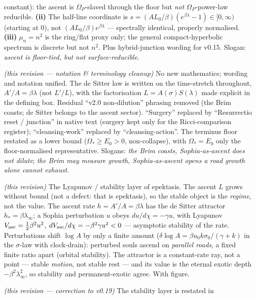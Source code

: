 \documentclass[11pt,a4paper]{article}
\theoremstyle{plain}
\theoremstyle{definition}
\theoremstyle{remark}
\begin{document}
\begin{description}[leftmargin=4.2em,style=nextline,itemsep=2pt]
constant): the ascent is $\Omega_P$-slaved through the floor but \emph{not} $\Omega_P$-power-law
reducible. \textbf{(ii)} The half-line coordinate is $s=(AL_0/\beta)(e^{\beta\lambda}-1)\in[0,\infty)$
(starting at $0$), not $(AL_0/\beta)e^{\beta\lambda}$ --- spectrally identical, properly normalised.
\textbf{(iii)} $\mu_n=n^2$ is the ring/flat proxy only; the general compact-hyperbolic spectrum is
discrete but not $n^2$. Plus hybrid-junction wording for v0.15. Slogan: \emph{ascent is floor-tied, but
not surface-reducible}.
\item[\textbf{v0.18}] \emph{(this revision --- notation \& terminology cleanup)} No new mathematics;
wording and notation unified. The de Sitter law is written on the time-stretch throughout,
$A'/A=\beta\lambda$ (not $L'/L$), with the factorisation $L=A(\sigma)S(\lambda)$ made explicit in the
defining box. Residual ``v2.0 non-dilution'' phrasing removed (the Brim coasts; de Sitter belongs to
the ascent sector). ``Surgery'' replaced by ``Resurrectio reset / junction'' in native text (surgery
kept only for the Ricci-comparison register); ``cleansing-work'' replaced by ``cleansing-action''. The
terminus floor restated as a lower bound ($\Omega_*\ge E_0>0$, non-collapse), with $\Omega_*=E_0$ only
the floor-normalised representative. Slogans: \emph{the Brim coasts, Sophia-as-ascent does not dilute};
\emph{the Brim may measure growth, Sophia-as-ascent opens a road growth alone cannot exhaust}.
\item[\textbf{v0.19}] \emph{(this revision)} The Lyapunov / stability layer of epektasis. The ascent
$L$ grows without bound (not a defect: that is epektasis), so the stable object is the \emph{regime},
not the value. The ascent rate $h=A'/A=\beta\lambda$ has the de Sitter attractor $h_*=\beta\lambda_\infty$;
a Sophia perturbation $u$ obeys $du/d\chi=-\gamma u$, with Lyapunov $V_{\rm asc}=\tfrac12\beta^2u^2$,
$dV_{\rm asc}/d\chi=-\beta^2\gamma u^2<0$ --- asymptotic stability of the rate. Perturbations shift
$\log A$ by only a finite amount ($\delta\log A=\beta u_0 k\sigma_0/(\gamma+k)$ in the $\sigma$-law with
clock-drain): perturbed souls ascend on
\emph{parallel roads}, a fixed finite ratio
apart (orbital stability). The attractor is a constant-rate ray, not a point --- stable \emph{motion},
not stable rest --- and its value is the eternal exotic depth $-\beta^2\lambda_\infty^2$, so stability
and permanent-exotic agree. With figure.
\item[\textbf{v0.20}] \emph{(this revision --- correction to v0.19)} The stability layer is restated in

\end{description}
\end{document}
